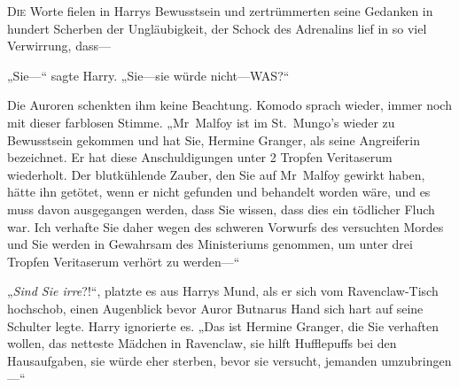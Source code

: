 
\lettrine{D}{ie} Worte fielen in Harrys Bewusstsein und zertrümmerten seine Gedanken in hundert Scherben der Ungläubigkeit, der Schock des Adrenalins lief in so viel Verwirrung, dass—

„Sie—“ sagte Harry.
„Sie—sie würde nicht—WAS?“

Die Auroren schenkten ihm keine Beachtung. Komodo sprach wieder, immer noch mit dieser farblosen Stimme.
„Mr~Malfoy ist im St.~Mungo’s wieder zu Bewusstsein gekommen und hat Sie, Hermine Granger, als seine Angreiferin bezeichnet. Er hat diese Anschuldigungen unter 2 Tropfen Veritaserum wiederholt. Der blutkühlende Zauber, den Sie auf Mr~Malfoy gewirkt haben, hätte ihn getötet, wenn er nicht gefunden und behandelt worden wäre, und es muss davon ausgegangen werden, dass Sie wissen, dass dies ein tödlicher Fluch war. Ich verhafte Sie daher wegen des schweren Vorwurfs des versuchten Mordes und Sie werden in Gewahrsam des Ministeriums genommen, um unter drei Tropfen Veritaserum verhört zu werden—“

„\emph{Sind Sie irre}?!“, platzte es aus Harrys Mund, als er sich vom Ravenclaw-Tisch hochschob, einen Augenblick bevor Auror Butnarus Hand sich hart auf seine Schulter legte. Harry ignorierte es.
„Das ist Hermine Granger, die Sie verhaften wollen, das netteste Mädchen in Ravenclaw, sie hilft Hufflepuffs bei den Hausaufgaben, sie würde eher sterben, bevor sie versucht, jemanden umzubringen—“


